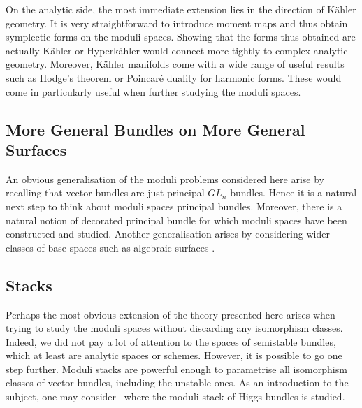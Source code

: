\documentclass[12pt]{ociamthesis}  %
\begin{document}
On the analytic side, the most immediate extension lies in the 
direction of K\"ahler geometry.
It is very straightforward to introduce moment maps and thus obtain
symplectic forms on the moduli spaces. Showing that the forms thus
obtained are actually K\"ahler or Hyperk\"ahler would connect more
tightly to complex analytic geometry. Moreover, K\"ahler manifolds
come with a wide range of useful results such as Hodge's theorem
or Poincar\'e duality for harmonic forms. These would come in
particularly useful when further studying the moduli spaces.

\subsection{More General Bundles on More General Surfaces}

An obvious generalisation of the moduli problems considered here
arise by recalling that vector bundles are just principal
$GL_n$-bundles. Hence it is a natural next step to think about
moduli spaces principal bundles. Moreover, there is a natural
notion of decorated principal bundle for which moduli spaces have
been constructed and studied. \missingcitation
Another generalisation arises by considering wider classes
of base spaces such as algebraic surfaces \missingcitation.

\subsection{Stacks}

Perhaps the most obvious extension of the theory presented here
arises when trying to study the moduli spaces without discarding
any isomorphism classes. Indeed, we did not pay a lot
of attention to the spaces of semistable bundles, which at least
are analytic spaces or schemes. However, it is possible to go one
step further. Moduli stacks are powerful enough to parametrise
all isomorphism classes of vector bundles, including the unstable ones.
As an introduction to the subject, one may consider~\cite{cm2017} where the moduli stack of Higgs bundles is studied.

\pagebreak
\renewcommand{\bibname}{References}
\printbibliography
\end{document}
